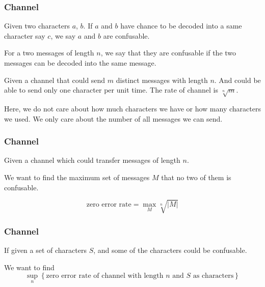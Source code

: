 \documentclass{beamer}
\begin{document}
                  \begin{frame}
                        \frametitle{Channel}
                        \begin{definition}[confusable]
                              Given two characters $a$, $b$. If $a$ and $b$ have chance to be decoded into a same character say $c$, we say $a$ and $b$ are confusable.

                              For a two messages of length $n$, we say that they are confusable if the two messages can be decoded into the same message.
                        \end{definition}
                        \pause
                        \begin{definition}
                              Given a channel that could send $m$ distinct messages with length $n$.
                              And could be able to send only one character per unit time.
                              The rate of channel is $\sqrt[n]{m}$.

                              Here, we do not care about how much characters we have or how many characters we used. We only care about the number of all messages we can send.
                              
                        \end{definition}
                  \end{frame}

                  \begin{frame}
                        \frametitle{Channel}
                        \begin{definition}
                              Given a channel which could transfer messages of length $n$.

                              We want to find the maximum set of messages $M$ that no two of them is confusable.

                              \begin{equation}
                                    \text{zero error rate} = \max_{M} \sqrt[n]{|M|}
                              \end{equation}
                        \end{definition}
                  \end{frame}

                  \begin{frame}
                        \frametitle{Channel}
                        If given a set of characters $S$, and some of the characters could be confusable.

                        We want to find
                        \begin{equation}
                              \sup_{n} \left\{
                                    \text{zero error rate of channel with length $n$ and $S$ as characters}
                              \right\}
                        \end{equation}
                  \end{frame}
\end{document}
